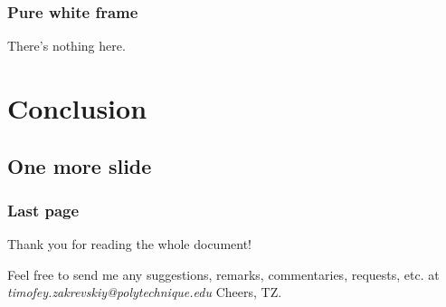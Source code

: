 \documentclass{beamer}
\begin{document}
{%
\begin{frame}
\frametitle{Pure white frame}

There's nothing here.

\end{frame}
}

\section{Conclusion}
\subsection{One more slide}
\begin{frame}
\frametitle{Last page}
Thank you for reading the whole document!

Feel free to send me any suggestions, remarks, commentaries, requests, etc. at \textit{{\color{Xblue}timofey.zakrevskiy@polytechnique.edu}}
\vfill
Cheers, TZ.
\end{frame}
\end{document}
